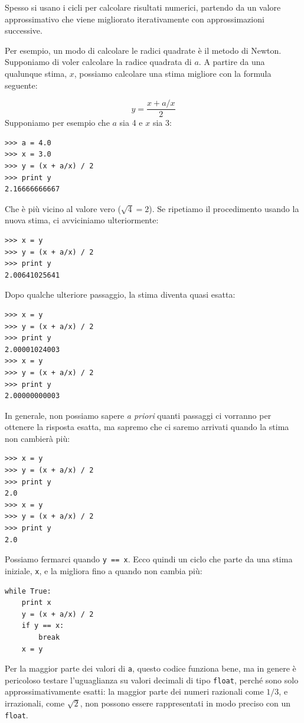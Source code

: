 \documentclass[10pt]{book}
\begin{document}
Spesso si usano i cicli per calcolare risultati numerici, partendo da un valore approssimativo che viene migliorato iterativamente con approssimazioni successive.

Per esempio, un modo di calcolare le radici quadrate è il metodo di Newton. Supponiamo di voler calcolare la radice quadrata di $a$. A partire da una qualunque stima, $x$, possiamo calcolare una stima migliore con la formula seguente:

\[ y = \frac{x + a/x}{2} \]
%
Supponiamo per esempio che $a$ sia 4 e $x$ sia 3:

\begin{verbatim}
>>> a = 4.0
>>> x = 3.0
>>> y = (x + a/x) / 2
>>> print y
2.16666666667
\end{verbatim}
%
Che è più vicino al valore vero ($\sqrt{4} = 2$).  Se ripetiamo il procedimento usando la nuova stima, ci avviciniamo ulteriormente:

\begin{verbatim}
>>> x = y
>>> y = (x + a/x) / 2
>>> print y
2.00641025641
\end{verbatim}
%
Dopo qualche ulteriore passaggio, la stima diventa quasi esatta:

\begin{verbatim}
>>> x = y
>>> y = (x + a/x) / 2
>>> print y
2.00001024003
>>> x = y
>>> y = (x + a/x) / 2
>>> print y
2.00000000003
\end{verbatim}
%
In generale, non possiamo sapere {\em a priori} quanti passaggi ci vorranno per ottenere la risposta esatta, ma sapremo che ci saremo arrivati quando la stima non cambierà più:

\begin{verbatim}
>>> x = y
>>> y = (x + a/x) / 2
>>> print y
2.0
>>> x = y
>>> y = (x + a/x) / 2
>>> print y
2.0
\end{verbatim}
%
Possiamo fermarci quando {\tt y == x}.  Ecco quindi un ciclo che parte da una stima iniziale, {\tt x}, e la migliora fino a quando non cambia più:

\begin{verbatim}
while True:
    print x
    y = (x + a/x) / 2
    if y == x:
        break
    x = y
\end{verbatim}
%
Per la maggior parte dei valori di {\tt a}, questo codice funziona bene, ma in genere è pericoloso testare l'uguaglianza su valori decimali di tipo {\tt float},
perché sono solo approssimativamente esatti: la maggior parte dei numeri razionali come $1/3$, e irrazionali, come $\sqrt{2}$, non possono essere rappresentati in modo preciso con un {\tt float}.
\end{document}
